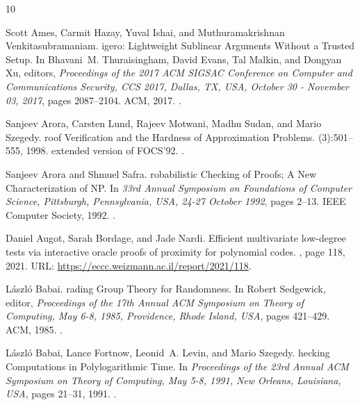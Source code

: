 \begin{thebibliography}{10}

Scott Ames, Carmit Hazay, Yuval Ishai, and Muthuramakrishnan
  Venkitasubramaniam.
igero: {L}ightweight {S}ublinear {A}rguments {W}ithout a {T}rusted
  {S}etup.
\newblock In Bhavani~M. Thuraisingham, David Evans, Tal Malkin, and Dongyan Xu,
  editors, {\em Proceedings of the 2017 {ACM} {SIGSAC} Conference on Computer
  and Communications Security, {CCS} 2017, Dallas, TX, USA, October 30 -
  November 03, 2017}, pages 2087--2104. {ACM}, 2017.
\newblock \href {https://doi.org/10.1145/3133956.3134104}
  {}.

Sanjeev Arora, Carsten Lund, Rajeev Motwani, Madhu Sudan, and Mario Szegedy.
roof {V}erification and the {H}ardness of {A}pproximation
  {P}roblems.
(3):501--555, 1998.
\newblock extended version of FOCS'92.
\newblock \href {https://doi.org/10.1145/278298.278306}
  {}.

Sanjeev Arora and Shmuel Safra.
robabilistic {C}hecking of {P}roofs; {{A}} {N}ew
  {C}haracterization of {{N}{P}}.
\newblock In {\em 33rd Annual Symposium on Foundations of Computer Science,
  Pittsburgh, Pennsylvania, USA, 24-27 October 1992}, pages 2--13. {IEEE}
  Computer Society, 1992.
\newblock \href {https://doi.org/10.1145/273865.273901}
  {}.

Daniel Augot, Sarah Bordage, and Jade Nardi.
\newblock Efficient multivariate low-degree tests via interactive oracle proofs
  of proximity for polynomial codes.
, page 118, 2021.
\newblock URL: \url{https://eccc.weizmann.ac.il/report/2021/118}.

L{\'{a}}szl{\'{o}} Babai.
rading {G}roup {T}heory for {R}andomness.
\newblock In Robert Sedgewick, editor, {\em Proceedings of the 17th Annual
  {ACM} Symposium on Theory of Computing, May 6-8, 1985, Providence, Rhode
  Island, {USA}}, pages 421--429. {ACM}, 1985.
\newblock \href {https://doi.org/10.1145/22145.22192}
  {}.

L{\'{a}}szl{\'{o}} Babai, Lance Fortnow, Leonid~A. Levin, and Mario Szegedy.
hecking {C}omputations in {P}olylogarithmic {T}ime.
\newblock In {\em Proceedings of the 23rd Annual {ACM} Symposium on Theory of
  Computing, May 5-8, 1991, New Orleans, Louisiana, {USA}}, pages 21--31, 1991.
\newblock \href {https://doi.org/10.1145/103418.103428}
  {}.


\end{thebibliography}
